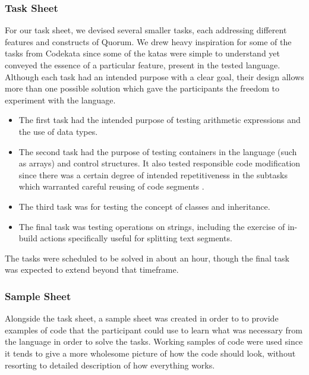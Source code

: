 \documentclass[preprint,10pt]{sigplanconf}
\begin{document}
\subsubsection{Task Sheet}
For our task sheet, we devised several smaller tasks, each addressing different features and constructs of Quorum. We drew heavy inspiration for some of the tasks from Codekata \cite{Codekata} since some of the katas were simple to understand yet conveyed the essence of a particular feature, present in the tested language.
Although each task had an intended purpose with a clear goal, their design allows more than one possible solution which gave the participants the freedom to experiment with the language.
\begin{itemize}
\item The first task had the intended purpose of testing arithmetic expressions and the use of data types.
\item The second task had the purpose of testing containers in the language (such as arrays) and control structures.
It also tested responsible code modification since there was a certain degree of intended repetitiveness in the subtasks which warranted careful reusing of code segments .%
\item The third task was for testing the concept of classes and inheritance.
\item The final task was testing operations on strings, including the exercise of in-build actions specifically useful for splitting text segments.
\end{itemize}
The tasks were scheduled to be solved in about an hour, though the final task was expected to extend beyond that timeframe.

\subsubsection{Sample Sheet}
Alongside the task sheet, a sample sheet was created in order to to provide examples of code that the participant could use to learn what was necessary from the language in order to solve the tasks. Working samples of code were used since it tends to give a more wholesome picture of how the code should look, without resorting to detailed description of how everything works. 
\end{document}
